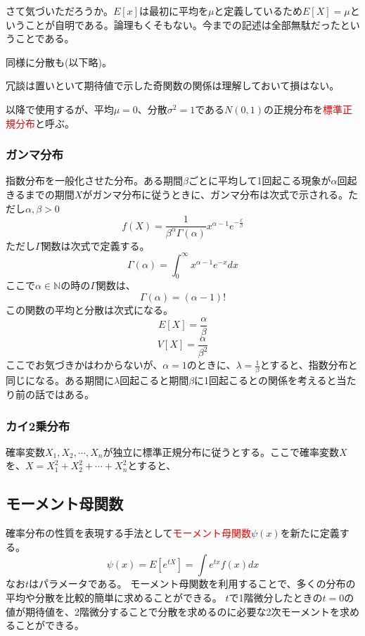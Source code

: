\documentclass[a4paper,10pt]{jarticle}
\begin{document}
さて気づいただろうか。$E[x]$は最初に平均を$\mu$と定義しているため$E[X]=\mu$ということが自明である。論理もくそもない。今までの記述は全部無駄だったということである。

同様に分散も(以下略)。

冗談は置いといて期待値で示した奇関数の関係は理解しておいて損はない。

以降で使用するが、平均$\mu=0$、分散$\sigma^2=1$である$N(0,1)$の正規分布を\textcolor{red}{標準正規分布}と呼ぶ。
\subsubsection{ガンマ分布}
指数分布を一般化させた分布。ある期間$\beta$ごとに平均して1回起こる現象が$\alpha$回起きるまでの期間$X$がガンマ分布に従うときに、ガンマ分布は次式で示される。ただし$\alpha,\beta>0$
\begin{equation}
    f(X) = \frac{1}{\beta^\alpha\Gamma(\alpha)}x^{\alpha-1}e^{-\frac{x}{\beta}}\tag{3,21}
\end{equation}
ただし$\Gamma$関数は次式で定義する。
\begin{equation}
    \Gamma(\alpha) = \int^\infty_0x^{\alpha-1}e^{-x}dx\tag{3,22}
\end{equation}
ここで$\alpha\in\mathbb{N}$の時の$\Gamma$関数は、
\begin{equation}
    \Gamma(\alpha) = (\alpha-1)!\tag{3,23}
\end{equation}
この関数の平均と分散は次式になる。
\begin{equation}
    E[X] = \frac{\alpha}{\beta}\tag{3,24}
\end{equation}
\begin{equation}
    V[X] = \frac{\alpha}{\beta^2}\tag{3,25}
\end{equation}
ここでお気づきかはわからないが、$\alpha=1$のときに、$\lambda= \frac{1}{\beta}$とすると、指数分布と同じになる。ある期間に$\lambda$回起こると期間$\beta$に1回起こるとの関係を考えると当たり前の話ではある。
\subsubsection{カイ2乗分布}
確率変数$X_1,X_2,\cdots,X_n$が独立に標準正規分布に従うとする。ここで確率変数$X$を、$X=X_1^2+X_2^2+\cdots+X_n^2$とすると、
\subsection{モーメント母関数}
確率分布の性質を表現する手法として\textcolor{red}{モーメント母関数}$\psi(x)$を新たに定義する。
\begin{equation}
    \psi(x) = E[e^{tX}] = \int e^{tx}f(x)dx\tag{3,21}
\end{equation}
なお$t$はパラメータである。
モーメント母関数を利用することで、多くの分布の平均や分散を比較的簡単に求めることができる。
$t$で1階微分したときの$t=0$の値が期待値を、2階微分することで分散を求めるのに必要な2次モーメントを求めることができる。
\end{document}
